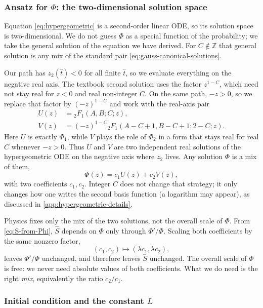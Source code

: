 \subsubsection{Ansatz for $\Phi$: the two-dimensional solution space}

Equation \eqref{eq:hypergeometric} is a second-order linear ODE, so its solution space is two-dimensional. We do not guess $\Phi$ as a special function of the probability; we take the general solution of the equation we have derived. For $C\notin\mathbb Z$ that general solution is any mix of the standard pair \cref{eq:gauss-canonical-solutions}.

Our path has $z_2(\hat t)<0$ for all finite $\hat t$, so we evaluate everything on the negative real axis. The textbook second solution uses the factor $z^{1-C}$, which need not stay real for $z<0$ and real non-integer $C$. On the same path, $-z>0$, so we replace that factor by $(-z)^{1-C}$ and work with the real-axis pair
\begin{subequations}
\label{eq:UV-definitions}
\begin{align}
U(z)&={}_2F_1(A,B;C;z),\\
V(z)&=(-z)^{1-C}
{}_2F_1(A-C+1,B-C+1;2-C;z).
\end{align}
\end{subequations}
Here $U$ is exactly $\Phi_1$, while $V$ plays the role of $\Phi_2$ in a form that stays real for real $C$ whenever $-z>0$. Thus $U$ and $V$ are two independent real solutions of the hypergeometric ODE on the negative axis where $z_2$ lives. Any solution $\Phi$ is a mix of them,
\begin{equation*}
\Phi(z)=c_1U(z)+c_2V(z),
\end{equation*}
with two coefficients $c_1,c_2$. Integer $C$ does not change that strategy; it only changes how one writes the second basis function (a logarithm may appear), as discussed in \cref{app:hypergeometric-details}.

Physics fixes only the mix of the two solutions, not the overall scale of $\Phi$. From \cref{eq:S-from-Phi}, $\widehat S$ depends on $\Phi$ only through $\Phi'/\Phi$. Scaling both coefficients by the same nonzero factor,
\[
(c_1,c_2)\longmapsto(\lambda c_1,\lambda c_2),
\]
leaves $\Phi'/\Phi$ unchanged, and therefore leaves $\widehat S$ unchanged. The overall scale of $\Phi$ is free: we never need absolute values of both coefficients. What we do need is the right \emph{mix}, equivalently the ratio $c_2/c_1$.

\subsubsection{Initial condition and the constant $L$}

